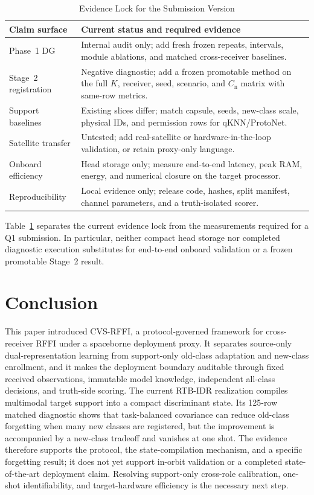\documentclass[journal]{IEEEtran}
\newcommand{\method}{CVS-RFFI}
\newcommand{\stagehead}{RTB-IDR}
\begin{document}
\begin{table}[!t]
\caption{Evidence Lock for the Submission Version}
\label{tab:missing}
\centering
\footnotesize
\begin{tabular}{p{}p{}}
\toprule
Claim surface & Current status and required evidence \\
\midrule
Phase~1 DG & Internal audit only; add fresh frozen repeats, intervals, module ablations, and matched cross-receiver baselines. \\
Stage~2 registration & Negative diagnostic; add a frozen promotable method on the full \(K\), receiver, seed, scenario, and \(C_{\mathrm{n}}\) matrix with same-row metrics. \\
Support baselines & Existing slices differ; match capsule, seeds, new-class scale, physical IDs, and permission rows for qKNN/ProtoNet. \\
Satellite transfer & Untested; add real-satellite or hardware-in-the-loop validation, or retain proxy-only language. \\
Onboard efficiency & Head storage only; measure end-to-end latency, peak RAM, energy, and numerical closure on the target processor. \\
Reproducibility & Local evidence only; release code, hashes, split manifest, channel parameters, and a truth-isolated scorer. \\
\bottomrule
\end{tabular}
\end{table}

Table~\ref{tab:missing} separates the current evidence lock from the measurements required for a Q1 submission. In particular, neither compact head storage nor completed diagnostic execution substitutes for end-to-end onboard validation or a frozen promotable Stage~2 result.

\section{Conclusion}

This paper introduced \method{}, a protocol-governed framework for cross-receiver RFFI under a spaceborne deployment proxy. It separates source-only dual-representation learning from support-only old-class adaptation and new-class enrollment, and it makes the deployment boundary auditable through fixed received observations, immutable model knowledge, independent all-class decisions, and truth-side scoring. The current \stagehead{} realization compiles multimodal target support into a compact discriminant state. Its 125-row matched diagnostic shows that task-balanced covariance can reduce old-class forgetting when many new classes are registered, but the improvement is accompanied by a new-class tradeoff and vanishes at one shot. The evidence therefore supports the protocol, the state-compilation mechanism, and a specific forgetting result; it does not yet support in-orbit validation or a completed state-of-the-art deployment claim. Resolving support-only cross-role calibration, one-shot identifiability, and target-hardware efficiency is the necessary next step.
\end{document}
